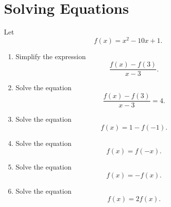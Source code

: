 \documentclass{ximera}
\begin{document}
\section{Solving Equations}

\begin{question} \label{Qkdfk4r3}
Let 
\[
    f(x) = x^2 - 10x + 1.
\]
\begin{enumerate}
\item Simplify the expression
\[
        \frac{f(x) - f(3)}{x-3} .
\]

\item Solve the equation 
\[
        \frac{f(x) - f(3)}{x-3}  = 4.
\]

\item Solve the equation 
\[
     f(x) = 1 - f(-1) .
\]

\item Solve the equation
\[
    f(x) = f(-x) .
\]

\item Solve the equation
\[
    f(x) = - f(x).
\]

\item Solve the equation
\[
     f(x) = 2f(x).
\]



\end{enumerate}



\end{question}
\end{document}
